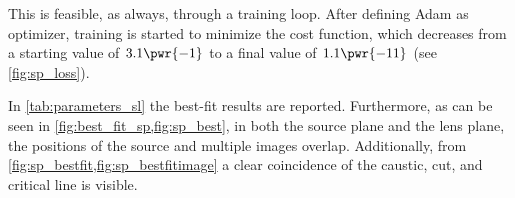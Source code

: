 This is feasible, as always, through a training loop. After defining Adam as optimizer, training is started to minimize the cost function, which decreases from a starting value of $3.1\pwr{-1}$ to a final value of $1.1\pwr{-11}$ (see \cref{fig:sp_loss}).

In \cref{tab:parameters_sl} the best-fit results are reported. Furthermore, as can be seen in \cref{fig:best_fit_sp,fig:sp_best}, in both the source plane and the lens plane, the positions of the source and multiple images overlap. Additionally, from \cref{fig:sp_bestfit,fig:sp_bestfitimage} a clear coincidence of the caustic, cut, and critical line is visible.

\begin{figure}
  \begin{minipage}{0.49\linewidth}
    \centering
  \end{minipage}
  \begin{minipage}{0.49\linewidth}
    \centering

\end{minipage}
\end{figure}

